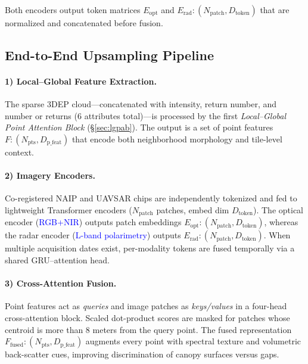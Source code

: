 \documentclass[preprint,12pt,authoryear]{elsarticle}
\begin{document}
Both encoders output token matrices $E_{\text{opt}}$ and $E_{\text{rad}}: (N_{\text{patch}}, D_{\text{token}})$ that are normalized and concatenated before fusion.



\clearpage

\subsection{End-to-End Upsampling Pipeline}
\label{sec:pipeline}

\paragraph{1) Local–Global Feature Extraction.}
The sparse 3DEP cloud—concatenated with intensity, return number, and number or returns (6 attributes total)—is processed by the first \emph{Local–Global Point Attention Block} (§\ref{sec:lgpab}). The output is a set of point features $F: (N_{\text{pts}}, D_{\text{p\_feat}})$ that encode both neighborhood morphology and tile-level context.

\paragraph{2) Imagery Encoders.}
Co-registered NAIP and UAVSAR chips are independently tokenized and fed to lightweight Transformer encoders ($N_{\text{patch}}$ patches, embed dim $D_{\text{token}}$).  
The optical encoder (\textcolor{blue}{RGB+NIR}) outputs patch embeddings $E_{\text{opt}}: (N_{\text{patch}}, D_{\text{token}})$, whereas the radar encoder (\textcolor{blue}{L-band polarimetry}) outputs $E_{\text{rad}}: (N_{\text{patch}}, D_{\text{token}})$.  
When multiple acquisition dates exist, per-modality tokens are fused temporally via a shared GRU–attention head.

\paragraph{3) Cross-Attention Fusion.}
Point features act as \emph{queries} and image patches as \emph{keys/values} in a four-head cross-attention block.  
Scaled dot-product scores are masked for patches whose centroid is more than 8 meters from the query point. 
The fused representation $F_{\text{fused}}: (N_{\text{pts}}, D_{\text{p\_feat}})$ augments every point with spectral texture and volumetric back-scatter cues, improving discrimination of canopy surfaces versus gaps.
\end{document}
